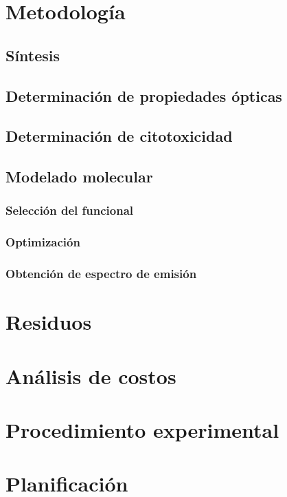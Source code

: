 \documentclass[spanish,mexico]{scrartcl}
\begin{document}
\section{Metodología}
\Blindtext[1]
\subsection{Síntesis}
\Blindtext
\subsection{Determinación de propiedades ópticas}
\blindmathtrue
\Blindtext
\subsection{Determinación de citotoxicidad}
\Blindtext
\subsection{Modelado molecular}
\blindmathtrue
\Blindtext
\subsubsection{Selección del funcional}
\Blindtext
\subsubsection{Optimización}
\blindmathtrue
\Blindtext
\subsubsection{Obtención de espectro de emisión}
\Blindtext
\section{Residuos}
\blindtext
\section{Análisis de costos}
\blindmathtrue
\blindtext
\section{Procedimiento experimental}
\blindmathtrue
\blindtext
\section{Planificación}
\blindtext

\printreactants{}
\printglossaries{}
\printbibliography{}

\listoftodos[Pendientes]
\end{document}

